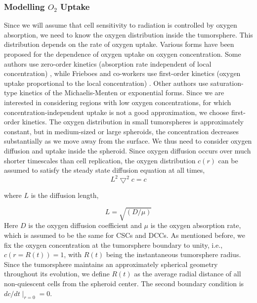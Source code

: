 \documentclass[10pt,letterpaper]{article}
\begin{document}
\subsubsection*{Modelling $O_2$ Uptake}

Since we will assume that cell sensitivity to radiation is controlled by oxygen absorption, we need to know the oxygen distribution inside the tumorsphere. This distribution depends on the rate of oxygen uptake. Various forms have been proposed for the dependence of oxygen uptake on oxygen concentration. Some authors use zero-order kinetics (absorption rate independent of local concentration) \cite{chow2001modeling, cai2013hybrid,grimes2016role}, while Frieboes and co-workers use first-order kinetics (oxygen uptake proportional to the local concentration) \cite{frieboes2006}. Other authors use saturation-type kinetics of the Michaelis-Menten \cite{wu2014oxygen} or exponential \cite{scalerandi1999nutrient} forms. Since we are interested in considering regions with low oxygen concentrations, for which concentration-independent uptake is not a good approximation, we choose first-order kinetics. The oxygen distribution in small tumorspheres is approximately constant, but in medium-sized or large spheroids, the concentration decreases substantially as we move away from the surface. We thus need to consider oxygen diffusion and uptake inside the spheroid. Since oxygen diffusion occurs over much shorter timescales than cell replication, the oxygen distribution $c(r)$ can be assumed to satisfy the steady state diffusion equation at all times,
\begin{equation}
	L^{2} {\bigtriangledown}^{2}c = c
\end{equation}

where $L$ is the diffusion length,

\begin{equation}
	L = \sqrt{(D/\mu)} 
\end{equation}
Here $D$ is the oxygen diffusion coefficient and $\mu$ is the oxygen absorption rate, which is assumed to be the same for CSCs and DCCs. As mentioned before, we fix the oxygen concentration at the tumorsphere boundary to unity, i.e., $c(r = R(t)) = 1$, with $R(t)$ being the instantaneous tumorsphere radius. Since the tumorsphere maintains an approximately spherical geometry throughout its evolution, we define $R(t)$ as the average radial distance of all non-quiescent cells from the spheroid center. The second boundary condition is ${dc}/{dt}{\mid}_{r=0}=0$.
\end{document}
